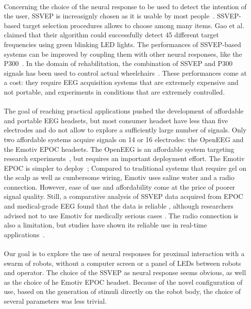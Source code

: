 \documentclass[smallextended]{svjour3}
\begin{document}
\\
Concerning the choice of the neural response to be used to detect the intention of the user, SSVEP is increasignly chosen as it is usable by most people~\cite{Guger2012}. SSVEP-based target selection procedures allows to choose among many items. Gao et al.~\cite{SSVEPfiability} claimed that their algorithm could successfully detect 45 different target frequencies using green blinking LED lights. The performances of SSVEP-based systems can be improved by coupling them with other neural responses, like the P300~\cite{yin2015hybrid}. In the domain of rehabilitation, the combination of SSVEP and P300 signals has been used to control actual wheelchairs~\cite{paper4}. These performances come at a cost: they require EEG acquisition systems that are extremely expensive and not portable, and experiments in conditions that are extremely controlled.\\
\\
The goal of reaching practical applications pushed the development of affordable and portable EEG headsets, but most consumer headset have less than five electrodes and do not allow to explore a sufficiently large number of signals. Only two affordable systems acquire signals on 14 or 16 electrodes: the OpenEEG and the Emotiv EPOC headsets. The OpenEEG is an affordable system targeting research experiments~\cite{Salehuddin2011}, but requires an important deployment effort. The Emotiv EPOC is simpler to deploy~\cite{jian2014improving,van2012designing}; Compared to traditional systems that require gel on the scalp as well as cumbersome wiring, Emotiv uses saline water and a radio connection. However, ease of use and affordability come at the price of poorer signal quality. Still, a comparative analysis of SSVEP data acquired from EPOC and medical-grade EEG found that the data is reliable \cite{liu2012implementation}, although researchers advised not to use Emotiv for medically serious cases \cite{duvinage2013performance}. The radio connection is also a limitation, but studies have shown its reliable use in real-time applications~\cite{hvaring2014comparison}.\\
\\
Our goal is to explore the use of neural responses for proximal interaction with a swarm of robots, without a computer screen or a panel of LEDs between robots and operator. The choice of the SSVEP as neural response seems obvious, as well as the choice of he Emotiv EPOC headset. Because of the novel configuration of use, based on the generation of stimuli directly on the robot body, the choice of several parameters was less trivial. \\
\end{document}
